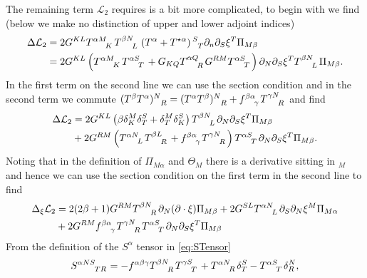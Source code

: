 The remaining term $\mathcal{L}_2$ requires is a bit more complicated, to begin with we find (below we make no distinction of upper and lower adjoint indices)
\begin{equation}
    \begin{aligned}
    \Delta \mathcal{L}_2 &= 2G^{KL}\tensor{T}{^{\alpha M}_K}\tensor{T}{^{\beta N}_L}\left(T^\alpha+T^{\star\alpha}\right)\tensor{}{^S_T}\pd_n\pd_S\xi^T\Pi_{M\beta}\\
    &= 2G^{KL}\left(\tensor{T}{^{\alpha M}_K}\tensor{T}{^{\alpha S}_T}+G_{KQ}\tensor{T}{^{\alpha Q}_R}G^{RM}\tensor{T}{^{\alpha S}_T}\right)\pd_N\pd_S\xi^T\tensor{T}{^{\beta N}_L}\Pi_{M\beta}.
    \end{aligned}
\end{equation}
In the first term on the second line we can use the section condition and in the second term we commute $(T^\beta T^\alpha)\tensor{}{^N_R} = (T^{\alpha}T^\beta)\tensor{}{^N_R}+\tensor{f}{^{\beta\alpha}_\gamma}\tensor{T}{^{\gamma N}_R}$ and find 
\begin{equation}
    \begin{aligned}
        \Delta \mathcal{L}_2 &= 2G^{KL}\left(\beta\delta^M_K\delta^S_T+\delta^M_T\delta^S_K\right)\tensor{T}{^{\beta N}_L}\pd_N\pd_S\xi^T\Pi_{M\beta}\\
        &+ 2G^{RM}\left(\tensor{T}{^{\alpha N}_L}\tensor{T}{^{\beta L}_R}+\tensor{f}{^{\beta\alpha}_\gamma}\tensor{T}{^{\gamma N}_R}\right)\tensor{T}{^{\alpha S}_T}\pd_N\pd_S\xi^T\Pi_{M\beta}.
    \end{aligned}
\end{equation}
Noting that in the definition of $\Pi_{M\alpha}$ and $\Theta_M$ there is a derivative sitting in $_M$ and hence we can use the section condition on the first term in the second line to find 
\begin{equation}\label{eq:Peter}
    \begin{aligned}
        \Delta_\xi \mathcal{L}_2 &= 2(2\beta+1)G^{RM}\tensor{T}{^{\beta N}_R}\pd_N(\pd\cdot\xi)\Pi_{M\beta}+2G^{SL}\tensor{T}{^{\alpha N}_L}\pd_S\pd_N\xi^M\Pi_{M\alpha}\\
        &+2G^{RM}\tensor{f}{^{\beta\alpha}_\gamma}\tensor{T}{^{\gamma N}_R}\tensor{T}{^{\alpha S}_T}\pd_N\pd_S\xi^T\Pi_{M\beta}
    \end{aligned}
\end{equation}
From the definition of the $S^\alpha$ tensor in \eqref{eq:STensor}
\begin{equation}
    \tensor{S}{^{\alpha NS}_{TR}} = -\tensor{f}{^{\alpha\beta\gamma}}\tensor{T}{^{\beta N}_R}\tensor{T}{^{\gamma S}_T}+\tensor{T}{^{\alpha N}_R}\delta^S_T-\tensor{T}{^{\alpha S}_T}\delta^N_R,
\end{equation}
